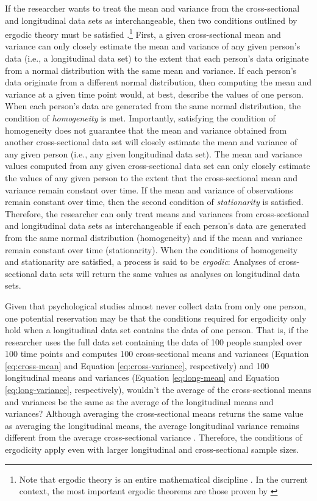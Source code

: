 \documentclass[
12pt, %
twoside,
english]{guelphthesis}
\begin{document}
If the researcher wants to treat the mean and variance from the cross-sectional and longitudinal data sets as interchangeable, then two conditions outlined by ergodic theory must be satisfied \autocite{molenaar2004,molenaar2009}.\footnote{Note that ergodic theory is an entire mathematical discipline \parencite[for an introduction, see][]{petersen1983}. In the current context, the most important ergodic theorems are those proven by \citeauthor{birkhoff1931} } First, a given cross-sectional mean and variance can only closely estimate the mean and variance of any given person's data (i.e., a longitudinal data set) to the extent that each person's data originate from a normal distribution with the same mean and variance. If each person's data originate from a different normal distribution, then computing the mean and variance at a given time point would, at best, describe the values of one person. When each person's data are generated from the same normal distribution, the condition of \emph{homogeneity} is met. Importantly, satisfying the condition of homogeneity does not guarantee that the mean and variance obtained from another cross-sectional data set will closely estimate the mean and variance of any given person (i.e., any given longitudinal data set). The mean and variance values computed from any given cross-sectional data set can only closely estimate the values of any given person to the extent that the cross-sectional mean and variance remain constant over time. If the mean and variance of observations remain constant over time, then the second condition of \emph{stationarity} is satisfied. Therefore, the researcher can only treat means and variances from cross-sectional and longitudinal data sets as interchangeable if each person's data are generated from the same normal distribution (homogeneity) and if the mean and variance remain constant over time (stationarity). When the conditions of homogeneity and stationarity are satisfied, a process is said to be \emph{ergodic}: Analyses of cross-sectional data sets will return the same values as analyses on longitudinal data sets.

Given that psychological studies almost never collect data from only one person, one potential reservation may be that the conditions required for ergodicity only hold when a longitudinal data set contains the data of one person. That is, if the researcher uses the full data set containing the data of 100 people sampled over 100 time points and computes 100 cross-sectional means and variances (Equation \ref{eq:cross-mean} and Equation \ref{eq:cross-variance}, respectively) and 100 longitudinal means and variances (Equation \ref{eq:long-mean} and Equation \ref{eq:long-variance}, respectively), wouldn't the average of the cross-sectional means and variances be the same as the average of the longitudinal means and variances? Although averaging the cross-sectional means returns the same value as averaging the longitudinal means, the average longitudinal variance remains different from the average cross-sectional variance \autocite[for several empirical examples, see][]{fisher2018}. Therefore, the conditions of ergodicity apply even with larger longitudinal and cross-sectional sample sizes.
\end{document}
